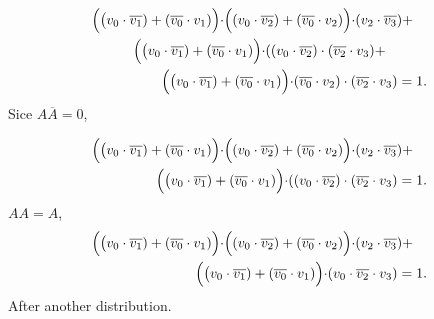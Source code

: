 \begin{equation}
    \begin{multlined}
        \Bigl( \big(v_0 \cdot \overline{v_1})+(\overline{v_0} \cdot v_1) \Bigl) \cdot \Bigl( (v_0 \cdot \overline{v_2})+(\overline{v_0} \cdot v_2) \Bigl) \cdot  (v_2 \cdot \overline{v_3})+ 
        \\
        \Bigl( \big(v_0 \cdot \overline{v_1})+(\overline{v_0} \cdot v_1) \Bigl) \cdot ( (v_0 \cdot \overline{v_2}) \cdot (\overline{v_2} \cdot v_3) + 
        \\
        \Bigl( \big(v_0 \cdot \overline{v_1})+(\overline{v_0} \cdot v_1) \Bigl) \cdot (\overline{v_0} \cdot v_2) \cdot (\overline{v_2} \cdot v_3) = 1.
        \end{multlined}
\end{equation}  
Sice $A\overline{A}=0$,

\begin{equation}
    \begin{multlined}
        \Bigl( \big(v_0 \cdot \overline{v_1})+(\overline{v_0} \cdot v_1) \Bigl) \cdot \Bigl( (v_0 \cdot \overline{v_2})+(\overline{v_0} \cdot v_2) \Bigl) \cdot  (v_2 \cdot \overline{v_3})+ 
        \\
        \Bigl( \big(v_0 \cdot \overline{v_1})+(\overline{v_0} \cdot v_1) \Bigl) \cdot ( (v_0 \cdot \overline{v_2}) \cdot (\overline{v_2} \cdot v_3) = 1.
        \end{multlined}
\end{equation}
$AA=A$,
\begin{equation}
    \begin{multlined}
        \Bigl( \big(v_0 \cdot \overline{v_1})+(\overline{v_0} \cdot v_1) \Bigl) \cdot \Bigl( (v_0 \cdot \overline{v_2})+(\overline{v_0} \cdot v_2) \Bigl) \cdot  (v_2 \cdot \overline{v_3})+ 
        \\
        \Bigl( \big(v_0 \cdot \overline{v_1})+(\overline{v_0} \cdot v_1) \Bigl) \cdot  (v_0 \cdot \overline{v_2} \cdot v_3) = 1.
        \end{multlined}
\end{equation}
After another distribution.

